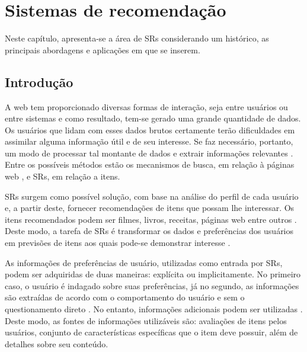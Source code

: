 \chapter{Sistemas de recomendação}
\label{cap:sistemas_de_recomendacao}

Neste capítulo, apresenta-se a área de SRs considerando um histórico, as principais abordagens e aplicações em que se inserem.  

\section{Introdução}


A web tem proporcionado diversas formas de interação, seja entre usuários ou entre sistemas e como resultado, tem-se gerado uma grande quantidade de dados. Os usuários que lidam com esses dados brutos certamente terão dificuldades em assimilar alguma informação útil e de seu interesse. Se faz necessário, portanto, um modo de processar tal montante de dados e extrair informações relevantes \cite{Aggarwal2016}. Entre os possíveis métodos estão os mecanismos de busca, em relação à páginas web \cite{Brin1998}, e SRs, em relação a itens.


SRs surgem como possível solução, com base na análise do perfil de cada usuário e, a partir deste, fornecer recomendações de itens que possam lhe interessar. Os itens recomendados podem ser filmes, livros, receitas, páginas web entre outros \cite{Bobadilla_2013}.  Deste modo, a tarefa de SRs é transformar os dados e preferências dos usuários em previsões de itens aos quais pode-se demonstrar interesse \cite{Lue2012}.


As informações de preferências de usuário, utilizadas como entrada por SRs, podem ser adquiridas de duas maneiras: explícita ou implicitamente. No primeiro caso, o usuário é indagado sobre suas preferências, já no segundo, as informações são extraídas de acordo com o comportamento do usuário e sem o questionamento direto \cite{Bobadilla_2013}. No entanto, informações adicionais podem ser utilizadas \cite{Jannach2010}. Deste modo, as fontes de informações utilizáveis são: avaliações de itens pelos usuários, conjunto de características específicas que o item deve possuir, além de detalhes sobre seu conteúdo. 

